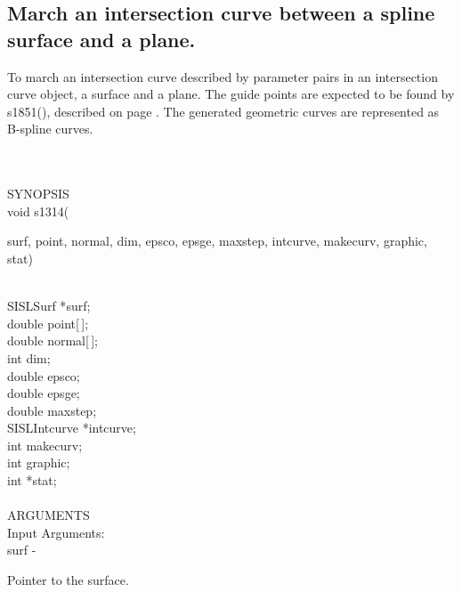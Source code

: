 \subsection{March an intersection curve between a spline surface and a plane.}
\begin{minipg1}
  To march an intersection curve described by parameter pairs in an intersection
  curve object, a surface and a plane.
  The guide points are expected to be found by s1851(), described on
  page \pageref{s1851}.
  The generated geometric curves are represented as B-spline curves.
\end{minipg1} \\ \\
SYNOPSIS\\
        \>void s1314(\begin{minipg3}
                {\fov surf}, {\fov point}, {\fov normal}, {\fov dim}, {\fov epsco}, {\fov epsge}, {\fov maxstep}, {\fov intcurve}, \linebreak
                {\fov makecurv}, {\fov graphic}, {\fov stat})
                \end{minipg3}\\[0.3ex]
                \>\>    SISLSurf        \>      *{\fov surf};\\
                \>\>    double  \>      {\fov point}[\,];\\
                \>\>    double  \>      {\fov normal}[\,];\\
                \>\>    int     \>      {\fov dim};\\
                \>\>    double  \>      {\fov epsco};\\
                \>\>    double  \>      {\fov epsge};\\
                \>\>    double  \>      {\fov maxstep};\\
                \>\>    SISLIntcurve\>  *{\fov intcurve};\\
                \>\>    int     \>      {\fov makecurv};\\
                \>\>    int     \>      {\fov graphic};\\
                \>\>    int     \>      *{\fov stat};\\
\\
ARGUMENTS\\
        \>Input Arguments:\\
        \>\>    {\fov surf}     \> - \> \begin{minipg2}
                                Pointer to the surface.
                                \end{minipg2}\\
